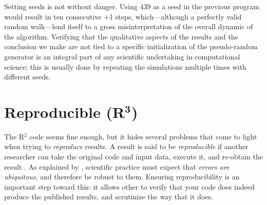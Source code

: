 \documentclass[a4paper,11pt]{article}
\begin{document}
Setting seeds is not without danger.  Using 439 as a seed in the previous
program would result in ten consecutive +1 steps, which---although a perfectly
valid random walk---lend itself to a gross misinterpretation of the overall
dynamic of the algorithm.  Verifying that the qualitative aspects of the
results and the conclusion we make are not tied to a specific initialization of
the pseudo-random generator is an integral part of any scientific undertaking
in computational science; this is usually done by repeating the simulations
multiple times with different seeds.

\section*{Reproducible (R$^{\mathbf 3}$)}

The R$^2$ code seems fine enough, but it hides several problems that come to
light when trying to {\em reproduce} results.  A result is said to be
\emph{reproducible} if another researcher can take the original code and input
data, execute it, and re-obtain the result \parencite{Peng:2006}. As explained
by \citeauthor{Donoho:2009} \parencite{Donoho:2009}, scientific practice must
expect that {\em errors are ubiquitous}, and therefore be robust to
them. Ensuring reproducibility is an important step toward this: it allows
other to verify that your code does indeed produce the published results, and
scrutinize the way that it does.\\
\end{document}
